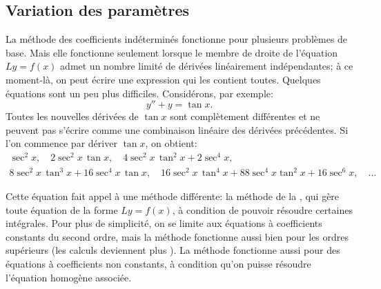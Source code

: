 \subsection{Variation des paramètres}

La méthode des coefficients indéterminés fonctionne pour plusieurs problèmes de base. Mais elle fonctionne seulement lorsque le membre de droite de l'équation  $Ly = f(x)$ 
admet un nombre limité de dérivées linéairement indépendantes; à ce moment-là, on peut écrire une expression qui les contient toutes. Quelques équations sont un peu plus difficiles. Considérons, par exemple: 
\begin{equation*}
y''+y = \tan x .
\end{equation*}
Toutes les nouvelles dérivées de $\tan x$ sont complètement différentes et ne peuvent pas s'écrire comme une combinaison linéaire des dérivées précédentes. Si l'on commence par dériver  $\tan x$, on obtient:
\begin{multline*}
\sec^2 x, \quad
2\sec^2 x \, \tan x, \quad
4 \sec^2 x \, \tan^2 x + 2 \sec^4 x, \\
8 \sec^2 x \, \tan^3 x + 16 \sec^4 x \, \tan x, \quad
16\sec^2 x \, \tan^4 x + 88 \sec^4 x \tan^2 x + 16 \sec^6 x, \quad
\ldots
\end{multline*}

Cette équation fait appel à une méthode différente: la méthode de la
\emph{}, qui gère toute équation de
la forme $Ly = f(x)$, à condition de pouvoir résoudre certaines intégrales.  Pour plus de simplicité, on se limite
 aux équations à coefficients constants du second ordre,
mais la méthode fonctionne aussi bien pour les ordres supérieurs (les calculs deviennent plus
). %
La méthode fonctionne aussi pour des équations à coefficients non constants, à condition qu'on puisse résoudre l'équation homogène associée.  

